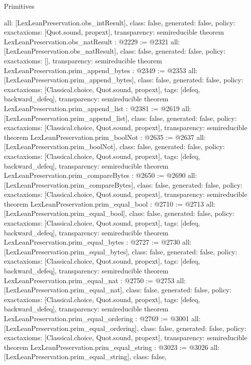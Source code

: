 \begin{lexlean}{Primitives}
\begin{coremodule}
{  all: [LexLeanPreservation.obs_intResult],
  class: false,
  generated: false,
  policy: exact{axioms: [Quot.sound, propext]},
  transparency: semireducible
}
theorem LexLeanPreservation.obs_natResult : @2229 := @2321 {
  all: [LexLeanPreservation.obs_natResult],
  class: false,
  generated: false,
  policy: exact{axioms: []},
  transparency: semireducible
}
theorem LexLeanPreservation.prim_append_bytes : @2349 := @2353 {
  all: [LexLeanPreservation.prim_append_bytes],
  class: false,
  generated: false,
  policy: exact{axioms: [Classical.choice, Quot.sound, propext]},
  tags: [defeq, backward_defeq],
  transparency: semireducible
}
theorem LexLeanPreservation.prim_append_list : @2381 := @2619 {
  all: [LexLeanPreservation.prim_append_list],
  class: false,
  generated: false,
  policy: exact{axioms: [Classical.choice, Quot.sound, propext]},
  transparency: semireducible
}
theorem LexLeanPreservation.prim_boolNot : @2635 := @2637 {
  all: [LexLeanPreservation.prim_boolNot],
  class: false,
  generated: false,
  policy: exact{axioms: [Classical.choice, Quot.sound, propext]},
  tags: [defeq, backward_defeq],
  transparency: semireducible
}
theorem LexLeanPreservation.prim_compareBytes : @2650 := @2690 {
  all: [LexLeanPreservation.prim_compareBytes],
  class: false,
  generated: false,
  policy: exact{axioms: [Classical.choice, Quot.sound, propext]},
  transparency: semireducible
}
theorem LexLeanPreservation.prim_equal_bool : @2710 := @2713 {
  all: [LexLeanPreservation.prim_equal_bool],
  class: false,
  generated: false,
  policy: exact{axioms: [Classical.choice, Quot.sound, propext]},
  tags: [defeq, backward_defeq],
  transparency: semireducible
}
theorem LexLeanPreservation.prim_equal_bytes : @2727 := @2730 {
  all: [LexLeanPreservation.prim_equal_bytes],
  class: false,
  generated: false,
  policy: exact{axioms: [Classical.choice, Quot.sound, propext]},
  tags: [defeq, backward_defeq],
  transparency: semireducible
}
theorem LexLeanPreservation.prim_equal_nat : @2750 := @2753 {
  all: [LexLeanPreservation.prim_equal_nat],
  class: false,
  generated: false,
  policy: exact{axioms: [Classical.choice, Quot.sound, propext]},
  tags: [defeq, backward_defeq],
  transparency: semireducible
}
theorem LexLeanPreservation.prim_equal_ordering : @2769 := @3001 {
  all: [LexLeanPreservation.prim_equal_ordering],
  class: false,
  generated: false,
  policy: exact{axioms: [Classical.choice, Quot.sound, propext]},
  transparency: semireducible
}
theorem LexLeanPreservation.prim_equal_string : @3023 := @3026 {
  all: [LexLeanPreservation.prim_equal_string],
  class: false,
}
\end{coremodule}
\end{lexlean}
